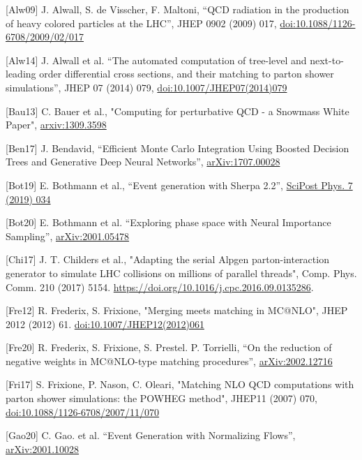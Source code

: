 \documentclass[11pt,a4paper]{article}
\begin{document}
{[}Alw09{]} J. Alwall, S. de Visscher, F. Maltoni, ``QCD radiation in
the production of heavy colored particles at the LHC'', JHEP 0902 (2009)
017,
\href{https://doi.org/10.1088/1126-6708/2009/02/017}{{doi:10.1088/1126-6708/2009/02/017}}

{[}Alw14{]} J. Alwall et al. ``The automated computation of tree-level
and next-to-leading order differential cross sections, and their
matching to parton shower simulations'', JHEP 07 (2014) 079,
\href{https://doi.org/10.1007/JHEP07(2014)079}{{doi:10.1007/JHEP07(2014)079}}

{[}Bau13{]} C. Bauer et al., "Computing for perturbative QCD - a
Snowmass White Paper",
\href{https://arxiv.org/abs/1309.3598}{{arxiv:1309.3598}}

{[}Ben17{]} J. Bendavid, ``Efficient Monte Carlo Integration Using
Boosted Decision Trees and Generative Deep Neural Networks'',
\href{https://arxiv.org/abs/1707.00028}{{arXiv:1707.00028}}

{[}Bot19{]} E. Bothmann et al., ``Event generation with Sherpa 2.2'',
\href{https://scipost.org/SciPostPhys.7.3.034}{{SciPost Phys. 7 (2019)
034}}

{[}Bot20{]} E. Bothmann et al. ``Exploring phase space with Neural
Importance Sampling'',
\href{https://arxiv.org/abs/2001.05478}{{arXiv:2001.05478}}

{[}Chi17{]} J. T. Childers et al., "Adapting the serial Alpgen
parton-interaction generator to simulate LHC collisions on millions of
parallel threads", Comp. Phys. Comm. 210 (2017) 5154.
\href{https://doi.org/10.1016/j.cpc.2016.09.0135286}{{https://doi.org/10.1016/j.cpc.2016.09.0135286}}.

{[}Fre12{]} R. Frederix, S. Frixione, "Merging meets matching in
MC@NLO", JHEP 2012 (2012) 61.
\href{https://doi.org/10.1007/JHEP12(2012)061}{{doi:10.1007/JHEP12(2012)061}}

{[}Fre20{]} R. Frederix, S. Frixione, S. Prestel. P. Torrielli, ``On the
reduction of negative weights in MC@NLO-type matching procedures'',
\href{https://arxiv.org/abs/2002.12716}{{arXiv:2002.12716}}

{[}Fri17{]} S. Frixione, P. Nason, C. Oleari, "Matching NLO QCD
computations with parton shower simulations: the POWHEG method", JHEP11
(2007) 070,
\href{https://doi.org/10.1088/1126-6708/2007/11/070}{{doi:10.1088/1126-6708/2007/11/070}}

{[}Gao20{]} C. Gao. et al. ``Event Generation with Normalizing Flows'',
\href{https://arxiv.org/abs/2001.10028}{{arXiv:2001.10028}}
\end{document}
